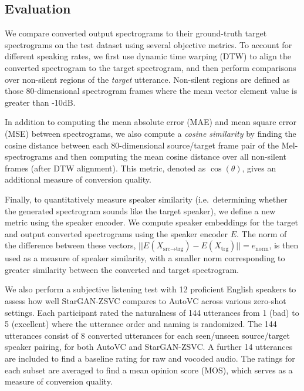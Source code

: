 \subsection{Evaluation}

We compare converted output spectrograms to their ground-truth target spectrograms on the test dataset using several objective metrics.
To account for different speaking rates, we first use dynamic time warping (DTW) to align the converted spectrogram to the target spectrogram, and then perform comparisons over non-silent regions of the \textit{target} utterance. Non-silent regions are defined as those 80-dimensional spectrogram frames where the mean vector element value is greater than -10dB.

In addition to computing the mean absolute error (MAE) and mean square error (MSE) between spectrograms, we also compute a \textit{cosine similarity} by finding the cosine distance between each 80-dimensional source/target frame pair of the Mel-spectrograms and then computing the mean cosine distance over all non-silent frames (after DTW alignment). 
This metric, denoted as $\cos(\theta)$, gives an additional measure of conversion quality. 

Finally, to quantitatively measure speaker similarity (i.e.\ determining whether the generated spectrogram sounds like the target speaker), we define a new metric using the speaker encoder.
We compute speaker embeddings for the target and output converted spectrograms using the speaker encoder $E$. 
The norm of the difference between these vectors, $||E(X_{\text{src}\rightarrow \text{trg}}) - E(X_{\text{trg}})|| = e_{\text{norm}}$, is then used as a measure of speaker similarity, with a smaller norm corresponding to greater similarity between the converted and target spectrogram.

We also perform a subjective listening test with 12 proficient English speakers to assess how well StarGAN-ZSVC compares to AutoVC across various zero-shot settings.
Each participant rated the naturalness of 144 utterances from 1 (bad) to 5 (excellent) where the utterance order and naming is randomized.
The 144 utterances consist of 8 converted utterances for each seen/unseen source/target speaker pairing, for both AutoVC and StarGAN-ZSVC.
A further 14 utterances are included to find a baseline rating for raw and vocoded audio.
The ratings for each subset are averaged to find a mean opinion score (MOS), which serves as a measure of conversion quality.
